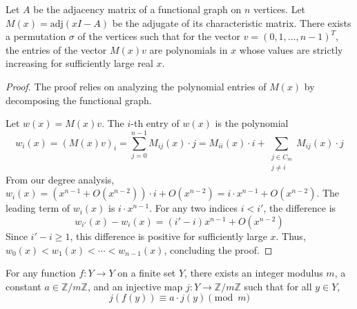 \begin{theorem} \label{thm:main_tech}
Let $A$ be the adjacency matrix of a functional graph on $n$ vertices. Let $M(x) = \text{adj}(xI - A)$ be the adjugate of its characteristic matrix. There exists a permutation $\sigma$ of the vertices such that for the vector $v = (0, 1, \ldots, n-1)^T$, the entries of the vector $M(x)v$ are polynomials in $x$ whose values are strictly increasing for sufficiently large real $x$.
\end{theorem}
\begin{proof}
The proof relies on analyzing the polynomial entries of $M(x)$ by decomposing the functional graph.

Let $w(x) = M(x)v$. The $i$-th entry of $w(x)$ is the polynomial
\[
w_i(x) = (M(x)v)_i = \sum_{j=0}^{n-1} M_{ij}(x) \cdot j = M_{ii}(x) \cdot i + \sum_{\substack{j \in C_m \\ j \neq i}} M_{ij}(x) \cdot j
\]
From our degree analysis, $w_i(x) = (x^{n-1} + O(x^{n-2})) \cdot i + O(x^{n-2}) = i \cdot x^{n-1} + O(x^{n-2})$. The leading term of $w_i(x)$ is $i \cdot x^{n-1}$. For any two indices $i < i'$, the difference is
\[
w_{i'}(x) - w_i(x) = (i' - i)x^{n-1} + O(x^{n-2})
\]
Since $i' - i \geq 1$, this difference is positive for sufficiently large $x$. Thus, $w_0(x) < w_1(x) < \cdots < w_{n-1}(x)$, concluding the proof.
\end{proof}

\begin{corollary} \label{cor:main}
For any function $f: Y \to Y$ on a finite set $Y$, there exists an integer modulus $m$, a constant $a \in \mathbb{Z}/m\mathbb{Z}$, and an injective map $j: Y \to \mathbb{Z}/m\mathbb{Z}$ such that for all $y \in Y$,
$$j(f(y)) \equiv a \cdot j(y) \pmod{m}$$
\end{corollary}


